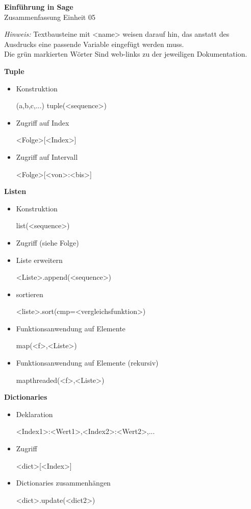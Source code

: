 \documentclass[a4paper,9pt,DIV15,twocolumn]{scrartcl}
\begin{document}
\begin{center}
    \textbf{\LARGE Einführung in Sage}\\
    {\large Zusammenfassung Einheit 05}
\end{center}
\textsl{Hinweis:} Textbausteine mit <name> weisen darauf hin, das anstatt des Ausdrucks eine passende Variable eingefügt werden muss.\\
Die {\color{Green}grün} markierten Wörter Sind web-links zu der jeweiligen Dokumentation.

\medskip
\textbf{Tuple}
\begin{itemize}
 \item Konstruktion
\begin{sagein}
 (a,b,c,...)
 tuple(<sequence>)
\end{sagein}
 \item Zugriff auf Index
\begin{sagein}
<Folge>[<Index>]
\end{sagein}
 \item Zugriff auf Intervall
\begin{sagein}
<Folge>[<von>:<bis>]
\end{sagein}
\end{itemize}


\textbf{Listen}
\begin{itemize}
 \item Konstruktion
\begin{sagein}
[a,b,c,...] 
list(<sequence>)
\end{sagein}
\item Zugriff (siehe Folge)
\item Liste erweitern
\begin{sagein}
<Liste>.append(<sequence>)
\end{sagein}
\item sortieren
\begin{sagein}
 <liste>.sort(cmp=<vergleichsfunktion>)
\end{sagein}
\item Funktionsanwendung auf Elemente
\begin{sagein}
 map(<f>,<Liste>)
\end{sagein}
\item Funktionsanwendung auf Elemente (rekursiv)
\begin{sagein}
 mapthreaded(<f>,<Liste>)
\end{sagein}
\end{itemize}

\textbf{Dictionaries}
\begin{itemize}
 \item Deklaration
\begin{sagein}
{<Index1>:<Wert1>,<Index2>:<Wert2>,...}
\end{sagein}
 \item Zugriff
\begin{sagein}
 <dict>[<Index>]
\end{sagein}
\item Dictionaries zusammenhängen
\begin{sagein}
 <dict>.update(<dict2>)
\end{sagein}
\end{itemize}
\end{document}
